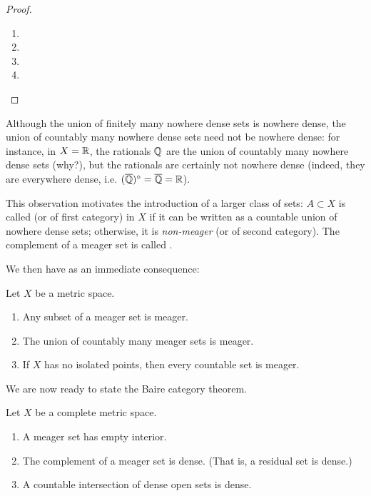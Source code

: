 \begin{proof} \
\begin{enumerate}[label=(\roman*)]
\item 
\item 
\item 
\item 
\end{enumerate}
\end{proof}

Although the union of finitely many nowhere dense sets is nowhere dense, the union of countably many nowhere dense sets need not be nowhere dense: for instance, in $X=\mathbb R$, the rationals $\mathbb Q$ are the union of countably many nowhere dense sets (why?), but the rationals are certainly not nowhere dense (indeed, they are everywhere dense, i.e. $(\overline{\mathbb Q})^\circ=\overline{\mathbb Q}=\mathbb R$).

This observation motivates the introduction of a larger class of sets: $A\subset X$ is called  (or of first category) in $X$ if it can be written as a countable union of nowhere dense sets; otherwise, it is \emph{non-meager} (or of second category). The complement of a meager set is called .

We then have as an immediate consequence:

\begin{lemma}
Let $X$ be a metric space.
\begin{enumerate}[label=(\roman*)]
\item Any subset of a meager set is meager.
\item The union of countably many meager sets is meager.
\item If $X$ has no isolated points, then every countable set is meager.
\end{enumerate}
\end{lemma}

We are now ready to state the Baire category theorem.

\begin{theorem}
Let $X$ be a complete metric space.
\begin{enumerate}[label=(\roman*)]
\item A meager set has empty interior.
\item The complement of a meager set is dense. (That is, a residual set is dense.)
\item A countable intersection of dense open sets is dense.
\end{enumerate}
\end{theorem}

